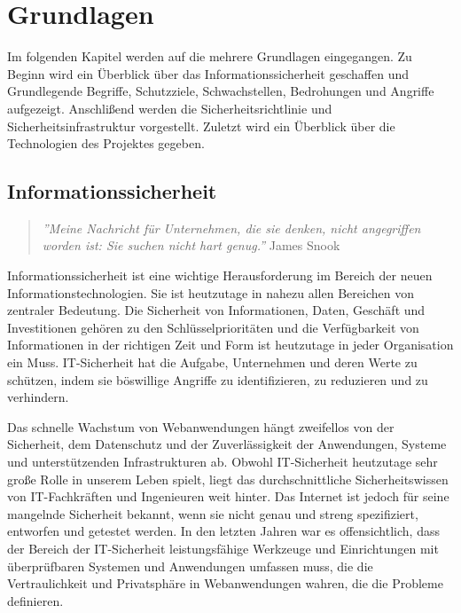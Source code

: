 \chapter{Grundlagen}
\label{chap:k2}

Im folgenden Kapitel werden auf die mehrere Grundlagen eingegangen. Zu Beginn wird ein Überblick über das Informationssicherheit geschaffen und Grundlegende Begriffe, Schutzziele, Schwachstellen, Bedrohungen und Angriffe aufgezeigt. Anschlißend werden die Sicherheitsrichtlinie und Sicherheitsinfrastruktur vorgestellt. Zuletzt wird ein Überblick über die Technologien des Projektes gegeben.

\section{Informationssicherheit}

\begin{quote}
	\emph{''Meine Nachricht für Unternehmen, die sie denken, nicht angegriffen worden ist: Sie suchen nicht hart genug.''}
	\hfill James Snook
\end{quote}

Informationssicherheit ist eine wichtige Herausforderung im Bereich der neuen Informationstechnologien. Sie ist heutzutage in nahezu allen Bereichen von zentraler Bedeutung.  Die Sicherheit von Informationen, Daten, Geschäft und Investitionen gehören zu den Schlüsselprioritäten und die Verfügbarkeit von Informationen in der richtigen Zeit und Form ist heutzutage in jeder Organisation ein Muss. IT-Sicherheit hat die Aufgabe, Unternehmen und deren Werte zu schützen, indem sie böswillige Angriffe zu identifizieren, zu reduzieren und zu verhindern.

Das schnelle Wachstum von Webanwendungen hängt zweifellos von der Sicherheit, dem Datenschutz und der Zuverlässigkeit der Anwendungen, Systeme und unterstützenden Infrastrukturen ab. Obwohl IT-Sicherheit heutzutage sehr große Rolle in unserem Leben spielt, liegt das durchschnittliche Sicherheitswissen von IT-Fachkräften und Ingenieuren weit hinter. Das Internet ist jedoch für seine mangelnde Sicherheit bekannt, wenn sie nicht genau und streng spezifiziert, entworfen und getestet werden. In den letzten Jahren war es offensichtlich, dass der Bereich der IT-Sicherheit leistungsfähige Werkzeuge und Einrichtungen mit überprüfbaren Systemen und Anwendungen umfassen muss, die die Vertraulichkeit und Privatsphäre in Webanwendungen wahren, die die Probleme definieren\cite[1]{furnell2008securing}.

